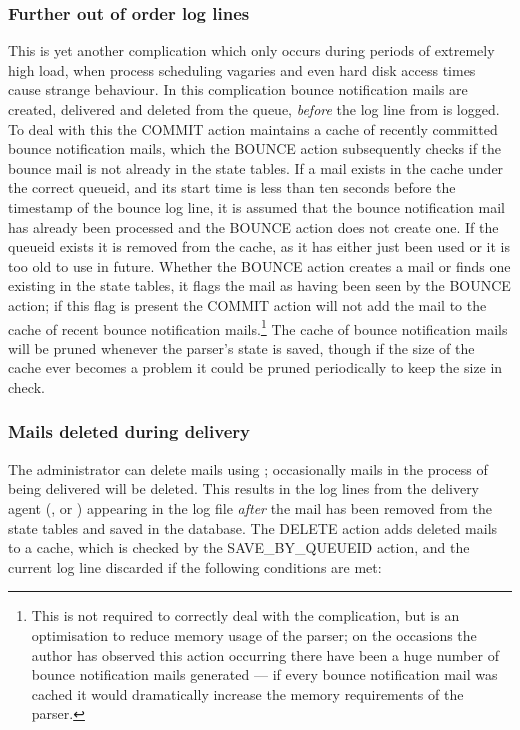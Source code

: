 \subsubsection{Further out of order log lines}

\label{Further out of order log lines}

This is yet another complication which only occurs during periods of
extremely high load, when process scheduling vagaries and even hard disk
access times cause strange behaviour.  In this complication bounce
notification mails are created, delivered and deleted from the queue,
\textit{before\/} the log line from  is logged.  To deal
with this the COMMIT action maintains a cache of recently committed bounce
notification mails, which the BOUNCE action subsequently checks if the
bounce mail is not already in the state tables. If a mail exists in the
cache under the correct queueid, and its start time is less than ten
seconds before the timestamp of the bounce log line, it is assumed that the
bounce notification mail has already been processed and the BOUNCE action
does not create one.  If the queueid exists it is removed from the cache,
as it has either just been used or it is too old to use in future.  Whether
the BOUNCE action creates a mail or finds one existing in the state tables,
it flags the mail as having been seen by the BOUNCE action; if this flag is
present the COMMIT action will not add the mail to the cache of recent
bounce notification mails.\footnote{This is not required to correctly deal
with the complication, but is an optimisation to reduce memory usage of the
parser; on the occasions the author has observed this action occurring
there have been a huge number of bounce notification mails generated --- if
every bounce notification mail was cached it would dramatically increase
the memory requirements of the parser.}  The cache of bounce notification
mails will be pruned whenever the parser's state is saved, though if the
size of the cache ever becomes a problem it could be pruned periodically to
keep the size in check.

\subsubsection{Mails deleted during delivery}

\label{Mails deleted during delivery}

The administrator can delete mails using ; occasionally
mails in the process of being delivered will be deleted.  This results in
the log lines from the delivery agent (,  or
) appearing in the log file \textit{after\/} the mail has been
removed from the state tables and saved in the database.  The DELETE action
adds deleted mails to a cache, which is checked by the SAVE\_BY\_QUEUEID
action, and the current log line discarded if the following conditions are
met:

